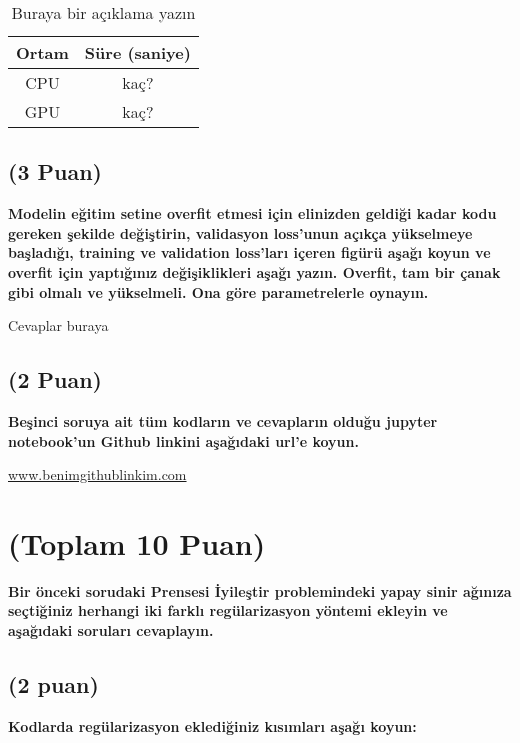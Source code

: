 \documentclass[11pt]{article}
\begin{document}
\begin{table}[ht!]
    \centering
    \caption{Buraya bir açıklama yazın}
    \begin{tabular}{c|c}
        Ortam & Süre (saniye) \\\hline
        CPU & kaç? \\
        GPU & kaç?\\
    \end{tabular}
    \label{tab:my_table}
\end{table}

\subsection{(3 Puan)} \textbf{Modelin eğitim setine overfit etmesi için elinizden geldiği kadar kodu gereken şekilde değiştirin, validasyon loss'unun açıkça yükselmeye başladığı, training ve validation loss'ları içeren figürü aşağı koyun ve overfit için yaptığınız değişiklikleri aşağı yazın. Overfit, tam bir çanak gibi olmalı ve yükselmeli. Ona göre parametrelerle oynayın.}

Cevaplar buraya

\begin{comment}
\begin{figure}[ht!]
    \centering
    \texttt{[image: mypicturehere.png]}
    \caption{Buraya açıklama yazın}
    \label{fig:my_pic}
\end{figure}
\end{comment}

\subsection{(2 Puan)} \textbf{Beşinci soruya ait tüm kodların ve cevapların olduğu jupyter notebook'un Github linkini aşağıdaki url'e koyun.}

\url{www.benimgithublinkim.com}

\section{(Toplam 10 Puan)} \textbf{Bir önceki sorudaki Prensesi İyileştir problemindeki yapay sinir ağınıza seçtiğiniz herhangi iki farklı regülarizasyon yöntemi ekleyin ve aşağıdaki soruları cevaplayın.} 

\subsection{(2 puan)} \textbf{Kodlarda regülarizasyon eklediğiniz kısımları aşağı koyun:} 
\end{document}

